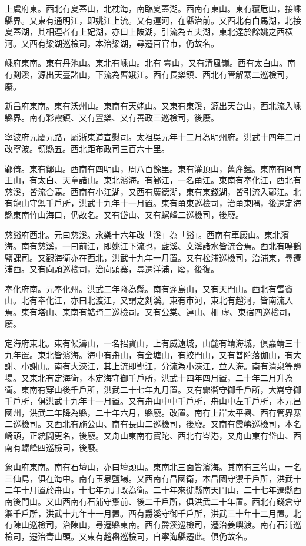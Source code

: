 上虞府東。西北有夏蓋山，北枕海，南臨夏蓋湖。西南有東山。東有覆卮山，接嵊縣界。又東有通明江，即姚江上流。又有運河，在縣治前。又西北有白馬湖，北接夏蓋湖，其相連者有上妃湖，亦曰上陂湖，引流為五夫湖，東北達於餘姚之西橫河。又西有梁湖巡檢司，本治梁湖，尋遷百官市，仍故名。

嵊府東南。東有丹池山。東北有嵊山。北有雩山，又有清風嶺。西有太白山。南有剡溪，源出天臺諸山，下流為曹娥江。西有長樂鎮、西北有管解寨二巡檢司，廢。

新昌府東南。東有沃州山。東南有天姥山。又東有東溪，源出天台山，西北流入嵊縣界。南有彩霞鎮、又有豐樂、又有善政三巡檢司，後廢。

寧波府元慶元路，屬浙東道宣慰司。太祖吳元年十二月為明州府。洪武十四年二月改寧波。領縣五。西北距布政司三百六十里。

鄞倚。東有鄮山。西南有四明山，周八百餘里。東有灌頂山，舊產鐵。東南有阿育王山，有太白、天童諸山。東北濱海。有鄞江，一名甬江。東南有奉化江，西北有慈溪，皆流合焉。西南有小江湖，又西有廣德湖，東有東錢湖，皆引流入鄞江。北有龍山守禦千戶所，洪武十九年十一月置。東有甬東巡檢司，治甬東隅，後遷定海縣東南竹山海口，仍故名。又有岱山、又有螺峰二巡檢司，後廢。

慈谿府西北。元曰慈溪。永樂十六年改「溪」為「谿」。西南有車廄山。東北濱海。南有慈溪，一曰前江，即姚江下流也，藍溪、文溪諸水皆流合焉。西北有鳴鶴鹽課司。又觀海衛亦在西北，洪武十九年一月置。又有松浦巡檢司，治浦東，尋遷浦西。又有向頭巡檢司，治向頭寨，尋遷洋浦，廢，後復。

奉化府南。元奉化州。洪武二年降為縣。南有蓬島山，又有天門山。西北有雪竇山。北有奉化江，亦曰北渡江，又謂之剡溪。東有市河，東北有趙河，皆南流入焉。東有塔山、東南有鮚琦二巡檢司。又有公棠、連山、柵虛、東宿四巡檢司，廢。

定海府東北。東有候濤山，一名招寶山，上有威遠城，山麓有靖海城，俱嘉靖三十九年置。東北皆濱海。海中有舟山，有金塘山，有蛟門山，又有普陀落伽山，有大謝、小謝山。南有大浹江，其上流即鄞江，分流為小浹江，並入海。南有清泉等鹽場。又東北有定海衛，本定海守御千戶所，洪武十四年四月置，二十年二月升為衛。東南有穿山後千戶所，洪武二十七年九月置。又有霩衢守御千戶所，大嵩守御千戶所，俱洪武十九年十一月置。又有舟山中中千戶所，舟山中左千戶所，本元昌國州，洪武二年降為縣，二十年六月，縣廢。改置。南有上岸太平嶴、西有管界寨二巡檢司。又西北有施公山、南有長山二巡檢司，後廢。又南有霞嶼巡檢司，本名崎頭，正統間更名，後廢。又舟山東南有寶陀、西北有岑港，又舟山東有岱山、西南有螺峰四巡檢司，後廢。

象山府東南。南有石壇山，亦曰壇頭山。東南北三面皆濱海。其南有三萼山，一名三仙島，俱在海中。南有玉泉鹽場。又西南有昌國衛，本昌國守禦千戶所，洪武十二年十月置於舟山，十七年九月改為衛。二十年來徙縣南天門山，二十七年遷縣西南後門山。又山西南有石浦守禦前、後二千戶所，俱洪武二十年置。西北有錢倉守禦千戶所，洪武十九年十一月置。西有爵溪守御千戶所，洪武三十年十二月置。北有陳山巡檢司，治陳山，尋遷縣東南。西有爵溪巡檢司，遷治姜嶼渡。南有石浦巡檢司，遷治青山頭。又東有趙嶴巡檢司，自寧海縣遷此。俱仍故名。

